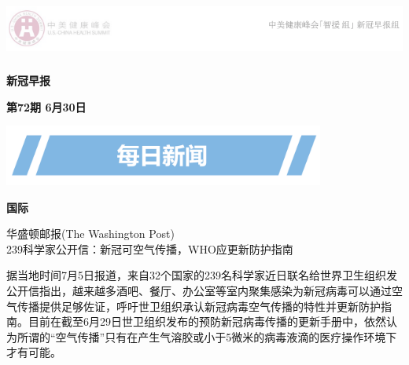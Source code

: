 \documentclass[
]{article}
\author{}
\date{\vspace{-2.5em}}
\begin{document}
\fontsize{22}{22}
\selectfont
\vspace{-10truemm}

\newcommand{\resheading}[1]{%
  \noindent\fcolorbox{lavenderblush}{lavenderblush}{\makebox[\dimexpr\textwidth-2\fboxsep-2\fboxrule][c]{\textbf{~#1}}}%
}

\begin{center}
\includegraphics[height=2cm]{./input/logo2.png} 
\end{center}

\begin{center}
\fontsize{45}{45}
\textcolor{glaucous}{\textbf{新冠早报}}
\end{center}

\begin{center}
\fontsize{22}{22}
{\textcolor{glaucous}{\textbf{第72期 \space 6月30日}}}
\end{center}

\vspace{2mm}
\begin{center}
\includegraphics[height=2cm]{./input/title1.png} 
\end{center}

\vspace{-5mm}

\begin{huge}{\textcolor{glaucous}{\textbf{国际}}}\end{huge}

\vspace{-3mm}

\begin{center}
\textcolor{glaucous}{华盛顿邮报(The Washington Post)}\\239科学家公开信：新冠可空气传播，WHO应更新防护指南

\end{center}

据当地时间7月5日报道，来自32个国家的239名科学家近日联名给世界卫生组织发公开信指出，越来越多酒吧、餐厅、办公室等室内聚集感染为新冠病毒可以通过空气传播提供足够佐证，呼吁世卫组织承认新冠病毒空气传播的特性并更新防护指南。目前在截至6月29日世卫组织发布的预防新冠病毒传播的更新手册中，依然认为所谓的``空气传播''只有在产生气溶胶或小于5微米的病毒液滴的医疗操作环境下才有可能。
\end{document}
